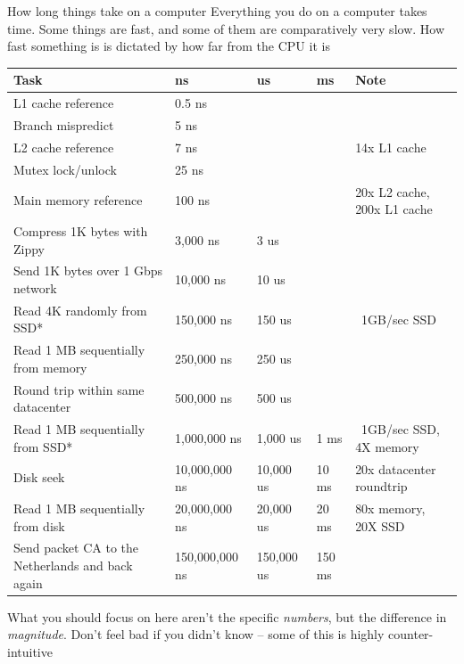 \documentclass{beamer}
\begin{document}
\begin{frame}{How long things take on a computer}
	Everything you do on a computer takes time. Some things are fast, and some of them are
	comparatively very slow. How fast something is is dictated by how far from the CPU
	it is
	{
	\tiny
			\begin{tabular}{lllll}
Task & ns & us & ms & Note \\
\hline
L1 cache reference                &          0.5 ns &&& \\
Branch mispredict                 &          5   ns &&& \\
L2 cache reference                &          7   ns &&                   &14x L1 cache \\
Mutex lock/unlock                 &         25   ns &&& \\
Main memory reference             &        100   ns &&                   &20x L2 cache, 200x L1 cache \\
Compress 1K bytes with Zippy      &      3,000   ns &      3 us&& \\
Send 1K bytes over 1 Gbps network &     10,000   ns &     10 us&& \\
Read 4K randomly from SSD*        &    150,000   ns &    150 us&         &~1GB/sec SSD \\
Read 1 MB sequentially from memory&    250,000   ns &    250 us&& \\
Round trip within same datacenter &    500,000   ns &    500 us&& \\
Read 1 MB sequentially from SSD*  &  1,000,000   ns &  1,000 us  & 1 ms &~1GB/sec SSD, 4X memory \\
Disk seek                         & 10,000,000   ns & 10,000 us  &10 ms &20x datacenter roundtrip \\
Read 1 MB sequentially from disk  & 20,000,000   ns & 20,000 us  &20 ms &80x memory, 20X SSD \\
Send packet CA to the Netherlands and back again & 150,000,000 ns & 150,000 us & 150 ms \\
\hline
			\end{tabular}
		}
			What you should focus on here aren't the specific \emph{numbers}, but the difference in
	\emph{magnitude}. Don't feel bad if you didn't know -- some of this is highly counter-intuitive
\end{frame}
\end{document}
